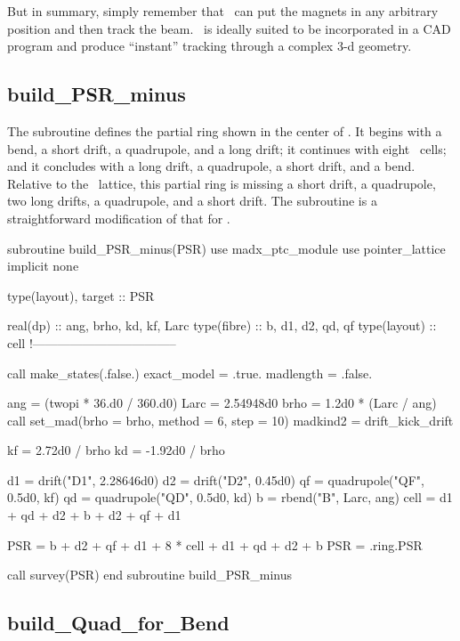 {But in summary, simply remember that \PTC\ can put the magnets in any arbitrary position and then track the beam. \PTC\ is ideally suited to be incorporated in a CAD program and produce ``instant'' tracking through a complex 3-d geometry.

}
\subsection{build_PSR_minus}

%
The subroutine  defines the partial ring shown
in the center of . It begins with a bend, a short
drift, a quadrupole, and a long drift; it continues with eight
\PSR\ cells; and it concludes with a long drift, a quadrupole, a short
drift, and a bend. Relative to the \PSR\ lattice, this partial ring is
missing a short drift, a quadrupole, two long drifts, a quadrupole,
and a short drift. The subroutine is a straightforward modification of
that for .
%

\begin{ptccode}
subroutine  build_PSR_minus(PSR)
use madx_ptc_module
use pointer_lattice
implicit none

type(layout), target :: PSR

real(dp) :: ang, brho, kd, kf, Larc
type(fibre) :: b, d1, d2, qd, qf
type(layout) :: cell
!-----------------------------------

call make_states(.false.)
exact_model = .true.
madlength = .false.

ang = (twopi * 36.d0 / 360.d0)
Larc = 2.54948d0
brho = 1.2d0 * (Larc / ang)
call set_mad(brho = brho, method = 6, step = 10)
madkind2 = drift_kick_drift

kf =  2.72d0 / brho
kd = -1.92d0 / brho

d1 = drift("D1", 2.28646d0)
d2 = drift("D2", 0.45d0)
qf = quadrupole("QF", 0.5d0, kf)
qd = quadrupole("QD", 0.5d0, kd)
b  = rbend("B", Larc, ang)
cell = d1 + qd + d2 + b + d2 + qf + d1

PSR = b + d2 + qf + d1 + 8 * cell + d1 + qd + d2 + b
PSR = .ring.PSR

call survey(PSR)
end subroutine build_PSR_minus
\end{ptccode}


\subsection{build_Quad_for_Bend}

